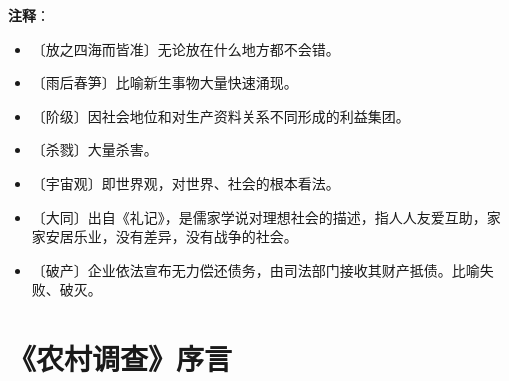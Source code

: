 \documentclass[12pt,UTF-8,openany]{ctexbook}
\begin{document}
\newpage

\textbf{注释}：

\vspace{-1em}

\begin{itemize}
    \setlength\itemsep{-0.2em}
    \item 〔放之四海而皆准〕无论放在什么地方都不会错。
    \item 〔雨后春笋〕比喻新生事物大量快速涌现。
    \item 〔阶级〕因社会地位和对生产资料关系不同形成的利益集团。
    \item 〔杀戮〕大量杀害。
    \item 〔宇宙观〕即世界观，对世界、社会的根本看法。
    \item 〔大同〕出自《礼记》，是儒家学说对理想社会的描述，指人人友爱互助，家家安居乐业，没有差异，没有战争的社会。
    \item 〔破产〕企业依法宣布无力偿还债务，由司法部门接收其财产抵债。比喻失败、破灭。
\end{itemize}

\chapter{《农村调查》序言}
\end{document}
